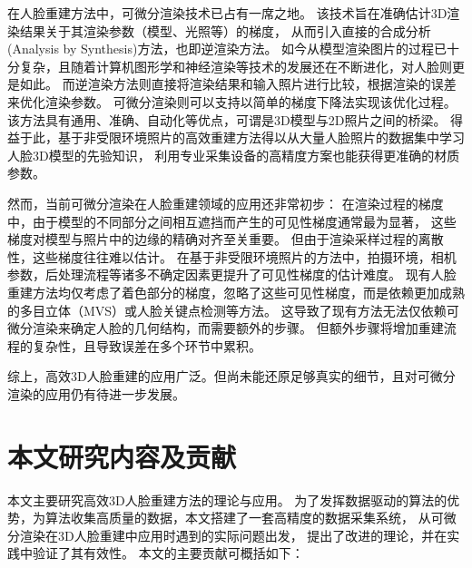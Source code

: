 在人脸重建方法中，可微分渲染技术已占有一席之地。
该技术旨在准确估计3D渲染结果关于其渲染参数（模型、光照等）的梯度，
从而引入直接的合成分析(Analysis by Synthesis)方法，也即逆渲染方法。
如今从模型渲染图片的过程已十分复杂，且随着计算机图形学和神经渲染等技术的发展还在不断进化，对人脸则更是如此。
而逆渲染方法则直接将渲染结果和输入照片进行比较，根据渲染的误差来优化渲染参数。
可微分渲染则可以支持以简单的梯度下降法实现该优化过程。
该方法具有通用、准确、自动化等优点，可谓是3D模型与2D照片之间的桥梁。
得益于此，基于非受限环境照片的高效重建方法得以从大量人脸照片的数据集中学习人脸3D模型的先验知识，
利用专业采集设备的高精度方案也能获得更准确的材质参数。

然而，当前可微分渲染在人脸重建领域的应用还非常初步：
在渲染过程的梯度中，由于模型的不同部分之间相互遮挡而产生的可见性梯度通常最为显著，
这些梯度对模型与照片中的边缘的精确对齐至关重要。
但由于渲染采样过程的离散性，这些梯度往往难以估计。
在基于非受限环境照片的方法中，拍摄环境，相机参数，后处理流程等诸多不确定因素更提升了可见性梯度的估计难度。
现有人脸重建方法均仅考虑了着色部分的梯度，忽略了这些可见性梯度，而是依赖更加成熟的多目立体（MVS）或人脸关键点检测等方法。
这导致了现有方法无法仅依赖可微分渲染来确定人脸的几何结构，而需要额外的步骤。
但额外步骤将增加重建流程的复杂性，且导致误差在多个环节中累积。

综上，高效3D人脸重建的应用广泛。但尚未能还原足够真实的细节，且对可微分渲染的应用仍有待进一步发展。

\section{本文研究内容及贡献}

本文主要研究高效3D人脸重建方法的理论与应用。
为了发挥数据驱动的算法的优势，为算法收集高质量的数据，本文搭建了一套高精度的数据采集系统，
从可微分渲染在3D人脸重建中应用时遇到的实际问题出发，
提出了改进的理论，并在实践中验证了其有效性。
本文的主要贡献可概括如下：

